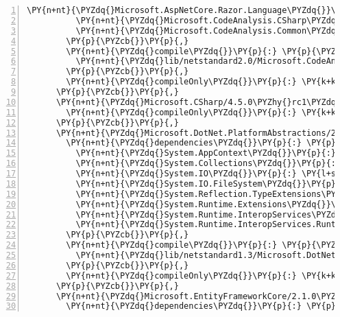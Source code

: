 \begin{Verbatim}[commandchars=\\\{\},numbers=left,firstnumber=1,stepnumber=1,numberblanklines=0]
          \PY{n+nt}{\PYZdq{}Microsoft.AspNetCore.Razor.Language\PYZdq{}}\PY{p}{:} \PY{l+s+s2}{\PYZdq{}2.1.0\PYZhy{}rc1\PYZhy{}final\PYZdq{}}\PY{p}{,}
          \PY{n+nt}{\PYZdq{}Microsoft.CodeAnalysis.CSharp\PYZdq{}}\PY{p}{:} \PY{l+s+s2}{\PYZdq{}2.8.0\PYZhy{}beta3\PYZdq{}}\PY{p}{,}
          \PY{n+nt}{\PYZdq{}Microsoft.CodeAnalysis.Common\PYZdq{}}\PY{p}{:} \PY{l+s+s2}{\PYZdq{}2.8.0\PYZhy{}beta3\PYZdq{}}
        \PY{p}{\PYZcb{}}\PY{p}{,}
        \PY{n+nt}{\PYZdq{}compile\PYZdq{}}\PY{p}{:} \PY{p}{\PYZob{}}
          \PY{n+nt}{\PYZdq{}lib/netstandard2.0/Microsoft.CodeAnalysis.Razor.dll\PYZdq{}}\PY{p}{:} \PY{p}{\PYZob{}}\PY{p}{\PYZcb{}}
        \PY{p}{\PYZcb{}}\PY{p}{,}
        \PY{n+nt}{\PYZdq{}compileOnly\PYZdq{}}\PY{p}{:} \PY{k+kc}{true}
      \PY{p}{\PYZcb{}}\PY{p}{,}
      \PY{n+nt}{\PYZdq{}Microsoft.CSharp/4.5.0\PYZhy{}rc1\PYZdq{}}\PY{p}{:} \PY{p}{\PYZob{}}
        \PY{n+nt}{\PYZdq{}compileOnly\PYZdq{}}\PY{p}{:} \PY{k+kc}{true}
      \PY{p}{\PYZcb{}}\PY{p}{,}
      \PY{n+nt}{\PYZdq{}Microsoft.DotNet.PlatformAbstractions/2.1.0\PYZhy{}rc1\PYZdq{}}\PY{p}{:} \PY{p}{\PYZob{}}
        \PY{n+nt}{\PYZdq{}dependencies\PYZdq{}}\PY{p}{:} \PY{p}{\PYZob{}}
          \PY{n+nt}{\PYZdq{}System.AppContext\PYZdq{}}\PY{p}{:} \PY{l+s+s2}{\PYZdq{}4.3.0\PYZdq{}}\PY{p}{,}
          \PY{n+nt}{\PYZdq{}System.Collections\PYZdq{}}\PY{p}{:} \PY{l+s+s2}{\PYZdq{}4.3.0\PYZdq{}}\PY{p}{,}
          \PY{n+nt}{\PYZdq{}System.IO\PYZdq{}}\PY{p}{:} \PY{l+s+s2}{\PYZdq{}4.3.0\PYZdq{}}\PY{p}{,}
          \PY{n+nt}{\PYZdq{}System.IO.FileSystem\PYZdq{}}\PY{p}{:} \PY{l+s+s2}{\PYZdq{}4.3.0\PYZdq{}}\PY{p}{,}
          \PY{n+nt}{\PYZdq{}System.Reflection.TypeExtensions\PYZdq{}}\PY{p}{:} \PY{l+s+s2}{\PYZdq{}4.3.0\PYZdq{}}\PY{p}{,}
          \PY{n+nt}{\PYZdq{}System.Runtime.Extensions\PYZdq{}}\PY{p}{:} \PY{l+s+s2}{\PYZdq{}4.3.0\PYZdq{}}\PY{p}{,}
          \PY{n+nt}{\PYZdq{}System.Runtime.InteropServices\PYZdq{}}\PY{p}{:} \PY{l+s+s2}{\PYZdq{}4.3.0\PYZdq{}}\PY{p}{,}
          \PY{n+nt}{\PYZdq{}System.Runtime.InteropServices.RuntimeInformation\PYZdq{}}\PY{p}{:} \PY{l+s+s2}{\PYZdq{}4.3.0\PYZdq{}}
        \PY{p}{\PYZcb{}}\PY{p}{,}
        \PY{n+nt}{\PYZdq{}compile\PYZdq{}}\PY{p}{:} \PY{p}{\PYZob{}}
          \PY{n+nt}{\PYZdq{}lib/netstandard1.3/Microsoft.DotNet.PlatformAbstractions.dll\PYZdq{}}\PY{p}{:} \PY{p}{\PYZob{}}\PY{p}{\PYZcb{}}
        \PY{p}{\PYZcb{}}\PY{p}{,}
        \PY{n+nt}{\PYZdq{}compileOnly\PYZdq{}}\PY{p}{:} \PY{k+kc}{true}
      \PY{p}{\PYZcb{}}\PY{p}{,}
      \PY{n+nt}{\PYZdq{}Microsoft.EntityFrameworkCore/2.1.0\PYZhy{}rc1\PYZhy{}final\PYZdq{}}\PY{p}{:} \PY{p}{\PYZob{}}
        \PY{n+nt}{\PYZdq{}dependencies\PYZdq{}}\PY{p}{:} \PY{p}{\PYZob{}}

\end{Verbatim}

